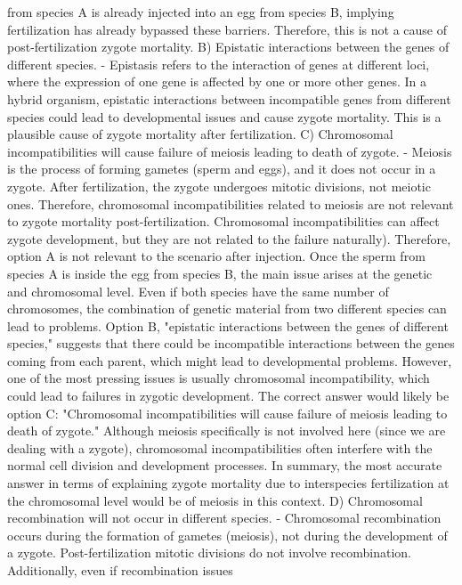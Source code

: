 from species A is already
injected into an egg from
species B, implying
fertilization has already
bypassed these barriers.
Therefore, this is not a cause
of post-fertilization zygote
mortality.
B) Epistatic interactions
between the genes of
different species.
- Epistasis refers to the
interaction of genes at
different loci, where the
expression of one gene is
affected by one or more other
genes. In a hybrid organism,
epistatic interactions between
incompatible genes from
different species could lead to
developmental issues and
cause zygote mortality. This
is a plausible cause of zygote
mortality after fertilization.
C) Chromosomal
incompatibilities will cause
failure of meiosis leading to
death of zygote.
- Meiosis is the process of
forming gametes (sperm and
eggs), and it does not occur
in a zygote. After fertilization,
the zygote undergoes mitotic
divisions, not meiotic ones.
Therefore, chromosomal
incompatibilities related to
meiosis are not relevant to
zygote mortality
post-fertilization.
Chromosomal
incompatibilities can affect
zygote development, but they
are not related to the failure
naturally). Therefore, option A
is not relevant to the scenario
after injection.
Once the sperm from species
A is inside the egg from
species B, the main issue
arises at the genetic and
chromosomal level. Even if
both species have the same
number of chromosomes, the
combination of genetic
material from two different
species can lead to problems.
Option B, "epistatic
interactions between the
genes of different species,"
suggests that there could be
incompatible interactions
between the genes coming
from each parent, which
might lead to developmental
problems.
However, one of the most
pressing issues is usually
chromosomal incompatibility,
which could lead to failures in
zygotic development. The
correct answer would likely
be option C: "Chromosomal
incompatibilities will cause
failure of meiosis leading to
death of zygote." Although
meiosis specifically is not
involved here (since we are
dealing with a zygote),
chromosomal
incompatibilities often
interfere with the normal cell
division and development
processes.
In summary, the most
accurate answer in terms of
explaining zygote mortality
due to interspecies
fertilization at the
chromosomal level would be
of meiosis in this context.
D) Chromosomal
recombination will not occur
in different species.
- Chromosomal
recombination occurs during
the formation of gametes
(meiosis), not during the
development of a zygote.
Post-fertilization mitotic
divisions do not involve
recombination. Additionally,
even if recombination issues
